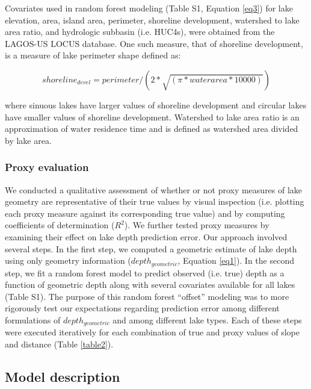 \documentclass[draft]{agujournal2019}
\begin{document}
Covariates used in random forest modeling (Table S1, Equation \ref{eq3}) for lake elevation, area, island area, perimeter, shoreline development, watershed to lake area ratio, and hydrologic subbasin (i.e. HUC4s), were obtained from the LAGOS-US LOCUS database. One such measure, that of shoreline development, is a measure of lake perimeter shape defined as:

\begin{linenomath*}
      \begin{equation}
            shoreline_{devel} = perimeter / (2 * \sqrt{(\pi * waterarea * 10000)}) \label{eq2}
      \end{equation}
      \end{linenomath*}

\noindent
where sinuous lakes have larger values of shoreline development and circular lakes have smaller values of shoreline development. Watershed to lake area ratio is an approximation of water residence time and is defined as watershed area divided by lake area.

\subsubsection{Proxy evaluation}
\noindent
We conducted a qualitative assessment of whether or not proxy measures of lake geometry are representative of their true values by visual inspection (i.e. plotting each proxy measure against its corresponding true value) and by computing coefficients of determination ($R^2$). We further tested proxy measures by examining their effect on lake depth prediction error. Our approach involved several steps. In the first step, we computed a geometric estimate of lake depth using only geometry information ($depth_{geometric}$, Equation \ref{eq1}). In the second step, we fit a random forest model to predict observed (i.e. true) depth as a function of geometric depth along with several covariates available for all lakes (Table S1). The purpose of this random forest “offset” modeling was to more rigorously test our expectations regarding prediction error among different formulations of $depth_{geometric}$ and among different lake types. Each of these steps were executed iteratively for each combination of true and proxy values of slope and distance (Table \ref{table2}).

\subsection{Model description}
\end{document}
